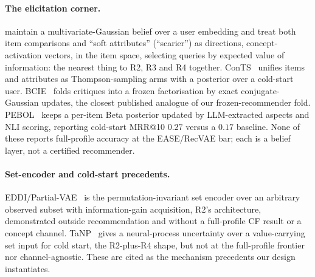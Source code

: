 \documentclass[manuscript,screen,review]{acmart}
\begin{document}
\paragraph{The elicitation corner.} \citet{biyik2023soft} maintain a multivariate-Gaussian belief over a user embedding and treat both item comparisons and ``soft attributes'' (``scarier'') as directions, concept-activation vectors, in the item space, selecting queries by expected value of information: the nearest thing to R2, R3 and R4 together. ConTS~\citep{li2021seamlessly} unifies items and attributes as Thompson-sampling arms with a posterior over a cold-start user. BCIE~\citep{toroghi2023bcie} folds critiques into a frozen factorisation by exact conjugate-Gaussian updates, the closest published analogue of our frozen-recommender fold. PEBOL~\citep{austin2024bayesian} keeps a per-item Beta posterior updated by LLM-extracted aspects and NLI scoring, reporting cold-start MRR@10 $0.27$ versus a $0.17$ baseline. None of these reports full-profile accuracy at the EASE/RecVAE bar; each is a belief layer, not a certified recommender.

\paragraph{Set-encoder and cold-start precedents.} EDDI/Partial-VAE~\citep{ma2019eddi} is the permutation-invariant set encoder over an arbitrary observed subset with information-gain acquisition, R2's architecture, demonstrated outside recommendation and without a full-profile CF result or a concept channel. TaNP~\citep{lin2021tanp} gives a neural-process uncertainty over a value-carrying set input for cold start, the R2-plus-R4 shape, but not at the full-profile frontier nor channel-agnostic. These are cited as the mechanism precedents our design instantiates.
\end{document}
